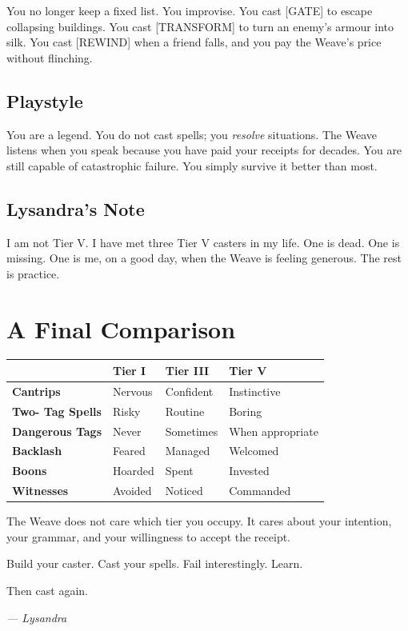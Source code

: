 You no longer keep a fixed list. You improvise. You cast [GATE] to escape collapsing buildings. You cast [TRANSFORM] to turn an enemy's armour into silk. You cast [REWIND] when a friend falls, and you pay the Weave's price without flinching.

\subsection{Playstyle}

You are a legend. You do not cast spells; you \emph{resolve} situations. The Weave listens when you speak because you have paid your receipts for decades. You are still capable of catastrophic failure. You simply survive it better than most.

\subsection{Lysandra's Note}

I am not Tier V. I have met three Tier V casters in my life. One is dead. One is missing. One is me, on a good day, when the Weave is feeling generous. The rest is practice.

\section{A Final Comparison}

\noindent
\begin{tabular}{|p{}|p{}|p{}|p{}|}
\hline
 & \textbf{Tier I} & \textbf{Tier III} & \textbf{Tier V} \\
\hline
\textbf{Cantrips} & Nervous & Confident & Instinctive \\
\hline
\textbf{Two- Tag Spells} & Risky & Routine & Boring \\
\hline
\textbf{Dangerous Tags} & Never & Sometimes & When appropriate \\
\hline
\textbf{Backlash} & Feared & Managed & Welcomed \\
\hline
\textbf{Boons} & Hoarded & Spent & Invested \\
\hline
\textbf{Witnesses} & Avoided & Noticed & Commanded \\
\hline
\end{tabular}

\noindent
The Weave does not care which tier you occupy. It cares about your intention, your grammar, and your willingness to accept the receipt.

Build your caster. Cast your spells. Fail interestingly. Learn.

Then cast again.

\textit{--- Lysandra}
